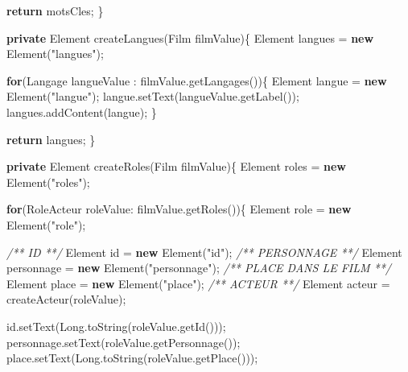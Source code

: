 \documentclass[]{article}
\newenvironment{Shaded}{}{}
\newcommand{\KeywordTok}[1]{\textcolor[rgb]{0.00,0.44,0.13}{\textbf{{#1}}}}
\newcommand{\StringTok}[1]{\textcolor[rgb]{0.25,0.44,0.63}{{#1}}}
\newcommand{\CommentTok}[1]{\textcolor[rgb]{0.38,0.63,0.69}{\textit{{#1}}}}
\newcommand{\FunctionTok}[1]{\textcolor[rgb]{0.02,0.16,0.49}{{#1}}}
\newcommand{\BuiltInTok}[1]{{#1}}
\newcommand{\NormalTok}[1]{{#1}}
\begin{document}
\begin{Shaded}
\begin{Highlighting}[]
		\KeywordTok{return} \NormalTok{motsCles;}
	\NormalTok{\}}

	\KeywordTok{private} \BuiltInTok{Element} \FunctionTok{createLangues}\NormalTok{(Film filmValue)\{}
		\BuiltInTok{Element} \NormalTok{langues = }\KeywordTok{new} \BuiltInTok{Element}\NormalTok{(}\StringTok{"langues"}\NormalTok{);}

		\KeywordTok{for}\NormalTok{(Langage langueValue : filmValue.}\FunctionTok{getLangages}\NormalTok{())\{}
			\BuiltInTok{Element} \NormalTok{langue = }\KeywordTok{new} \BuiltInTok{Element}\NormalTok{(}\StringTok{"langue"}\NormalTok{);}
			\NormalTok{langue.}\FunctionTok{setText}\NormalTok{(langueValue.}\FunctionTok{getLabel}\NormalTok{());}
			\NormalTok{langues.}\FunctionTok{addContent}\NormalTok{(langue);}
		\NormalTok{\}}

		\KeywordTok{return} \NormalTok{langues;}
	\NormalTok{\}}

	\KeywordTok{private} \BuiltInTok{Element} \FunctionTok{createRoles}\NormalTok{(Film filmValue)\{}
		\BuiltInTok{Element} \NormalTok{roles = }\KeywordTok{new} \BuiltInTok{Element}\NormalTok{(}\StringTok{"roles"}\NormalTok{);}

		\KeywordTok{for}\NormalTok{(RoleActeur roleValue: filmValue.}\FunctionTok{getRoles}\NormalTok{())\{}
		  \BuiltInTok{Element} \NormalTok{role = }\KeywordTok{new} \BuiltInTok{Element}\NormalTok{(}\StringTok{"role"}\NormalTok{);}

		  \CommentTok{/** ID **/}
		  \BuiltInTok{Element} \NormalTok{id = }\KeywordTok{new} \BuiltInTok{Element}\NormalTok{(}\StringTok{"id"}\NormalTok{);}
		  \CommentTok{/** PERSONNAGE **/}
		  \BuiltInTok{Element} \NormalTok{personnage = }\KeywordTok{new} \BuiltInTok{Element}\NormalTok{(}\StringTok{"personnage"}\NormalTok{);}
		  \CommentTok{/** PLACE DANS LE FILM **/}
		  \BuiltInTok{Element} \NormalTok{place = }\KeywordTok{new} \BuiltInTok{Element}\NormalTok{(}\StringTok{"place"}\NormalTok{);}
		  \CommentTok{/** ACTEUR **/}
		  \BuiltInTok{Element} \NormalTok{acteur = }\FunctionTok{createActeur}\NormalTok{(roleValue);}

		  \NormalTok{id.}\FunctionTok{setText}\NormalTok{(}\BuiltInTok{Long}\NormalTok{.}\FunctionTok{toString}\NormalTok{(roleValue.}\FunctionTok{getId}\NormalTok{()));}
		  \NormalTok{personnage.}\FunctionTok{setText}\NormalTok{(roleValue.}\FunctionTok{getPersonnage}\NormalTok{());}
		  \NormalTok{place.}\FunctionTok{setText}\NormalTok{(}\BuiltInTok{Long}\NormalTok{.}\FunctionTok{toString}\NormalTok{(roleValue.}\FunctionTok{getPlace}\NormalTok{()));}


\end{Highlighting}
\end{Shaded}
\end{document}
